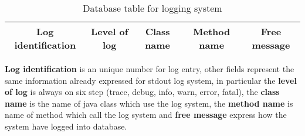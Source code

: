 \begin{table}[!ht]
	\centering
	\caption{Database table for logging system}
	\begin{tabular}{|c|c|c|c|c|}
	\hline\hline 
	\textbf{Log identification} & \textbf{Level of log} & \textbf{Class name} & \textbf{Method name} & \textbf{Free message}\\
	\hline
	\hline     %
 	\end{tabular} 
	\label{tab:DBLog}
\end{table}
\textbf{Log identification} is an unique number for log entry, other fields represent the same information already expressed for stdout log system, in particular the \textbf{level of log} is always on six step (trace, debug, info, warn, error, fatal), the \textbf{class name} is the name of java class which use the log system, the \textbf{method name} is name of method which call the log system and \textbf{free message} express how the system have logged into database.
